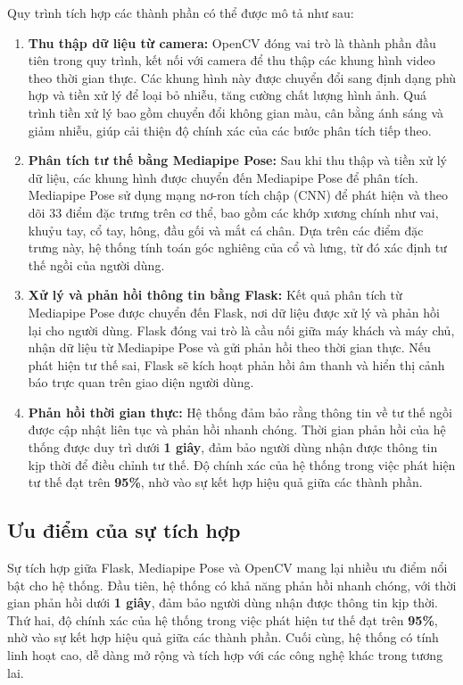 \documentclass[conference]{IEEEtran}
\begin{document}
Quy trình tích hợp các thành phần có thể được mô tả như sau:

\begin{enumerate}
    \item \textbf{Thu thập dữ liệu từ camera:} OpenCV đóng vai trò là thành phần đầu tiên trong quy trình, kết nối với camera để thu thập các khung hình video theo thời gian thực. Các khung hình này được chuyển đổi sang định dạng phù hợp và tiền xử lý để loại bỏ nhiễu, tăng cường chất lượng hình ảnh. Quá trình tiền xử lý bao gồm chuyển đổi không gian màu, cân bằng ánh sáng và giảm nhiễu, giúp cải thiện độ chính xác của các bước phân tích tiếp theo.
    \item \textbf{Phân tích tư thế bằng Mediapipe Pose:} Sau khi thu thập và tiền xử lý dữ liệu, các khung hình được chuyển đến Mediapipe Pose để phân tích. Mediapipe Pose sử dụng mạng nơ-ron tích chập (CNN) để phát hiện và theo dõi 33 điểm đặc trưng trên cơ thể, bao gồm các khớp xương chính như vai, khuỷu tay, cổ tay, hông, đầu gối và mắt cá chân. Dựa trên các điểm đặc trưng này, hệ thống tính toán góc nghiêng của cổ và lưng, từ đó xác định tư thế ngồi của người dùng.
    \item \textbf{Xử lý và phản hồi thông tin bằng Flask:} Kết quả phân tích từ Mediapipe Pose được chuyển đến Flask, nơi dữ liệu được xử lý và phản hồi lại cho người dùng. Flask đóng vai trò là cầu nối giữa máy khách và máy chủ, nhận dữ liệu từ Mediapipe Pose và gửi phản hồi theo thời gian thực. Nếu phát hiện tư thế sai, Flask sẽ kích hoạt phản hồi âm thanh và hiển thị cảnh báo trực quan trên giao diện người dùng.
    \item \textbf{Phản hồi thời gian thực:} Hệ thống đảm bảo rằng thông tin về tư thế ngồi được cập nhật liên tục và phản hồi nhanh chóng. Thời gian phản hồi của hệ thống được duy trì dưới \textbf{1 giây}, đảm bảo người dùng nhận được thông tin kịp thời để điều chỉnh tư thế. Độ chính xác của hệ thống trong việc phát hiện tư thế đạt trên \textbf{95\%}, nhờ vào sự kết hợp hiệu quả giữa các thành phần.
\end{enumerate}

\subsection{Ưu điểm của sự tích hợp}
Sự tích hợp giữa Flask, Mediapipe Pose và OpenCV mang lại nhiều ưu điểm nổi bật cho hệ thống. Đầu tiên, hệ thống có khả năng phản hồi nhanh chóng, với thời gian phản hồi dưới \textbf{1 giây}, đảm bảo người dùng nhận được thông tin kịp thời. Thứ hai, độ chính xác của hệ thống trong việc phát hiện tư thế đạt trên \textbf{95\%}, nhờ vào sự kết hợp hiệu quả giữa các thành phần. Cuối cùng, hệ thống có tính linh hoạt cao, dễ dàng mở rộng và tích hợp với các công nghệ khác trong tương lai.
\end{document}
